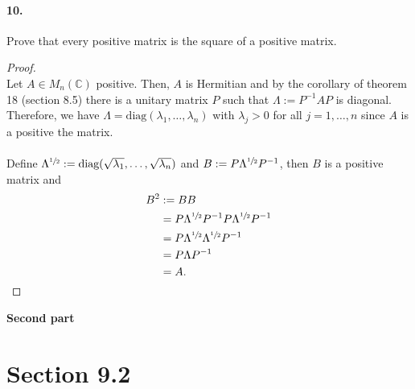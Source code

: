 \documentclass{article}
\theoremstyle{plain}
\theoremstyle{definition}
\theoremstyle{remark}
\newcommand{\co}{\mathbb{C}}
\begin{document}
    \paragraph{10.}
    Prove that every positive matrix is the square of a positive matrix.
      \begin{proof}$ $\\
        Let $A\in M_n (\co)$ positive. Then, $A$ is Hermitian and by the corollary of theorem 18 (section 8.5) there is a unitary matrix $P$ such that $\Lambda := P^{-1}AP$ is diagonal. Therefore, we have $\Lambda = \text{diag} (\lambda_1,\ldots,\lambda_n)$ with $\lambda _j >0$ for all $j=1,\ldots,n$ since $A$ is a positive the matrix.\\\\
        Define $\Lambda^{\sfrac{1}{2}} : = \text{diag}(\sqrt{\lambda_1},\ldots, \sqrt{\lambda_n})$ and $B := P \Lambda^{\sfrac{1}{2}} P^{-1}$, then $B$ is a positive matrix and
        \begin{align*}
          B^2 & := B B \\
              & =  P \Lambda^{\sfrac{1}{2}} P^{-1} P \Lambda^{\sfrac{1}{2}} P^{-1}\\
              & = P \Lambda^{\sfrac{1}{2}} \Lambda^{\sfrac{1}{2}} P^{-1}\\
              & = P \Lambda P^{-1}\\
              & = A.
        \end{align*}


      \end{proof}


\begin{center}
  \vspace{1.5cm}
        {\textbf{\LARGE Second part}}
\end{center}
  \section*{Section 9.2}
\end{document}
